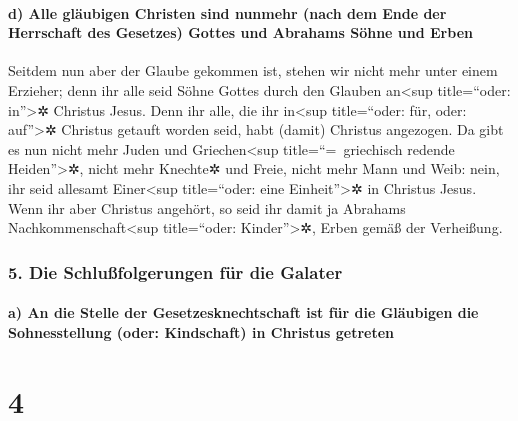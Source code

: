 \hypertarget{d-alle-gluxe4ubigen-christen-sind-nunmehr-nach-dem-ende-der-herrschaft-des-gesetzes-gottes-und-abrahams-suxf6hne-und-erben}{%
\paragraph{d) Alle gläubigen Christen sind nunmehr (nach dem Ende der
Herrschaft des Gesetzes) Gottes und Abrahams Söhne und
Erben}\label{d-alle-gluxe4ubigen-christen-sind-nunmehr-nach-dem-ende-der-herrschaft-des-gesetzes-gottes-und-abrahams-suxf6hne-und-erben}}

 Seitdem nun aber der Glaube gekommen ist, stehen wir
nicht mehr unter einem Erzieher;  denn ihr alle seid
Söhne Gottes durch den Glauben an\textless sup title=``oder:
in''\textgreater✲ Christus Jesus.  Denn ihr alle, die ihr
in\textless sup title=``oder: für, oder: auf''\textgreater✲ Christus
getauft worden seid, habt (damit) Christus angezogen.  Da
gibt es nun nicht mehr Juden und Griechen\textless sup
title=``=~griechisch redende Heiden''\textgreater✲, nicht mehr Knechte✲
und Freie, nicht mehr Mann und Weib: nein, ihr seid allesamt
Einer\textless sup title=``oder: eine Einheit''\textgreater✲ in Christus
Jesus.  Wenn ihr aber Christus angehört, so seid ihr
damit ja Abrahams Nachkommenschaft\textless sup title=``oder:
Kinder''\textgreater✲, Erben gemäß der Verheißung.

\hypertarget{die-schluuxdffolgerungen-fuxfcr-die-galater}{%
\subsubsection{5. Die Schlußfolgerungen für die
Galater}\label{die-schluuxdffolgerungen-fuxfcr-die-galater}}

\hypertarget{a-an-die-stelle-der-gesetzesknechtschaft-ist-fuxfcr-die-gluxe4ubigen-die-sohnesstellung-oder-kindschaft-in-christus-getreten}{%
\paragraph{a) An die Stelle der Gesetzesknechtschaft ist für die
Gläubigen die Sohnesstellung (oder: Kindschaft) in Christus
getreten}\label{a-an-die-stelle-der-gesetzesknechtschaft-ist-fuxfcr-die-gluxe4ubigen-die-sohnesstellung-oder-kindschaft-in-christus-getreten}}

\hypertarget{section-3}{%
\section{4}\label{section-3}}

